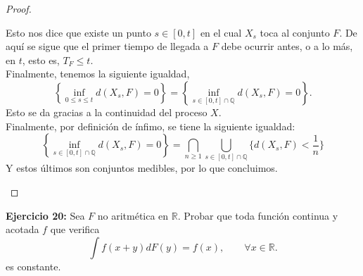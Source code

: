 \documentclass[letterpaper]{article}
\newcommand{\Q}{\mathbb{Q}}
\newcommand{\R}{\mathbb{R}}
\newcommand{\1}{\mathds{1}}
\theoremstyle{definition}
\theoremstyle{definition}
\theoremstyle{definition}
\theoremstyle{definition}
\theoremstyle{definition}
\begin{document}
\begin{proof}
\begin{itemize}
  Esto nos dice que existe un punto $s\in[0,t]$ en el cual $X_s$ toca al conjunto $F$. De aquí se sigue que el primer tiempo de llegada a $F$ debe ocurrir antes, o a lo más, en $t$, esto es, $T_F\leq t$.\\

  Finalmente, tenemos la siguiente igualdad,
  \[
    \left\{\inf_{0\leq s\leq t} d(X_s,F)=0\right\}=\left\{\inf_{s\in [0,t]\cap \Q} d(X_s,F)=0\right\}.
  \]
  Esto se da gracias a la continuidad del proceso $X$.\\

  Finalmente, por definición de ínfimo, se tiene la siguiente igualdad:\
  \[
    \left\{\inf_{s\in [0,t]\cap \Q} d(X_s,F)=0\right\}=\bigcap_{n\geq1}\bigcup_{s\in[0,t]\cap\Q}\{d(X_s,F)<\frac{1}{n}\}
    \]
    Y estos últimos son conjuntos medibles, por lo que concluimos.
  \end{itemize} 
 \end{proof}
 \noindent \textbf{Ejercicio 20:} Sea $F$ no aritmética en $\R$. Probar que toda función continua y acotada $f$ que verifica 
 \[
 \int f(x+y)dF(y)=f(x), \qquad \forall x \in \R.
 \]
 es constante.
\end{document}
